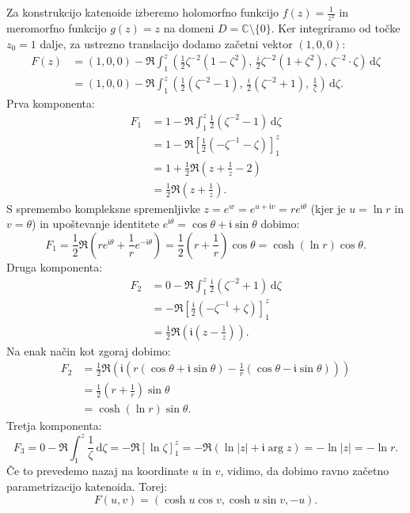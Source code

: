 \documentclass[fin1, tisk, bibtex]{fmfdelo}
\begin{document}
Za konstrukcijo katenoide izberemo holomorfno funkcijo $f(z) = \frac{1}{z^2}$ in meromorfno funkcijo $g(z) = z$ na domeni $D = \mathbb{C} \setminus \{0\}$. Ker integriramo od točke $z_0=1$ dalje, za ustrezno translacijo dodamo začetni vektor $(1,0,0)$:
\begin{align*}
    F(z) &= (1,0,0) - \Re \int_1^z \left( \frac{1}{2} \zeta^{-2} \left(1-\zeta^2\right), \, \frac{i}{2} \zeta^{-2} \left(1+\zeta^2\right), \, \zeta^{-2} \cdot \zeta \right) \, \mathrm{d}\zeta \\    
    &= (1,0,0) - \Re \int_1^z \left( \frac{1}{2}\left(\zeta^{-2}-1\right), \, \frac{i}{2}\left(\zeta^{-2}+1\right), \, \frac{1}{\zeta} \right) \, \mathrm{d}\zeta.    
\end{align*}
Prva komponenta:
\begin{align*}
    F_1 &= 1 - \Re \int_1^z \frac{1}{2}\left(\zeta^{-2}-1\right) \,\mathrm{d}\zeta \\
    &= 1 - \Re \left[ \frac{1}{2}\left(-\zeta^{-1}-\zeta\right) \right]_1^z \\
    &= 1 + \frac{1}{2} \Re \left( z + \frac{1}{z} - 2 \right) \\
    &= \frac{1}{2} \Re \left( z + \frac{1}{z} \right).
\end{align*}
S spremembo kompleksne spremenljivke $z = e^w = e^{u+\mathfrak{i}v} = r e^{\mathfrak{i}\theta}$ (kjer je $u = \ln r$ in $v = \theta$) in upoštevanje identitete $e^{\mathfrak{i} \theta}=\cos \theta+\mathfrak{i} \sin \theta$ dobimo:
\begin{equation*}
    F_1 = \frac{1}{2} \Re \left( r e^{\mathfrak{i}\theta} + \frac{1}{r} e^{-\mathfrak{i}\theta} \right) = \frac{1}{2}\left(r + \frac{1}{r}\right) \cos \theta = \cosh (\ln r) \cos \theta.
\end{equation*}
Druga komponenta:
\begin{align*}
    F_2 &= 0 - \Re \int_1^z \frac{\mathfrak{i}}{2}\left(\zeta^{-2}+1\right) \, \mathrm{d}\zeta \\
    &= -\Re \left[ \frac{\mathfrak{i}}{2}\left(-\zeta^{-1}+\zeta\right) \right]_1^z \\
    &= \frac{1}{2} \Re \left( \mathfrak{i}\left(z - \frac{1}{z}\right) \right).
\end{align*}
Na enak način kot zgoraj dobimo:
\begin{align*}
    F_2 &= \frac{1}{2} \Re \left( \mathfrak{i} \left( r(\cos \theta + \mathfrak{i} \sin \theta) - \frac{1}{r}(\cos \theta - \mathfrak{i} \sin \theta) \right) \right) \\
    &= \frac{1}{2}\left(r + \frac{1}{r}\right) \sin \theta \\
    &= \cosh (\ln r) \sin \theta.
\end{align*}
Tretja komponenta:
\begin{equation*}
F_3 = 0 - \Re \int_1^z \frac{1}{\zeta} \, \mathrm{d}\zeta = -\Re[\ln \zeta]_1^z = -\Re(\ln |z| + \mathfrak{i} \arg z) = -\ln |z| = -\ln r.
\end{equation*}
Če to prevedemo nazaj na koordinate $u$ in $v$, vidimo, da dobimo ravno začetno parametrizacijo katenoida. Torej: 
\begin{equation*}
    F(u, v) = (\cosh u \cos v, \cosh u \sin v, -u).
\end{equation*}
\end{document}
